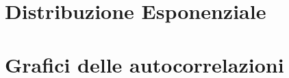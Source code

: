 \section{Distribuzione Esponenziale}
\begin{comment}
\begin{figure}[H]
\begin{center}
	
	\texttt{[image: grafici\_Exponential/AverageResponseTime.png]}
	\caption[Tempo di risposta del sistema senza Overload Management (Legge Front-End:Esponenziale)]
	{Tempo di risposta del sistema senza Overload Management (Legge Front-End:Esponenziale)}
	\label{fig:exp_res_time}
	\end{center}
	\end{figure}
	
\begin{figure}[H]
	
\begin{center}
	\texttt{[image: grafici\_Exponential/ThroughputSessions.png]}
	\caption[Throughput del sistema senza Overload Management (Legge Front-End:Esponenziale)]
	{Tempo di risposta del sistema senza Overload Management (Legge Front-End:Esponenziale)}
	\label{fig:exp_res_time}
	\end{center}
	\end{figure}
\end{comment}
\section{Grafici delle autocorrelazioni}
\begin{comment}
\begin{figure}[H]
	\begin{center}
	\texttt{[image: grafici\_Autocorrelazione/seed625435336.png]}
	\caption[Autocorrelazione per il seed 625435336]{Autocorrelazione per il seed 625435336.}
	\label{fig:exp_res_time}
	\end{center}
\end{figure}

\begin{figure}[H]
	\begin{center}
	\texttt{[image: grafici\_Autocorrelazione/seed37524306.png]}
	\caption[Autocorrelazione per il seed 37524306]{Autocorrelazione per il seed 37524306.}
	\label{fig:exp_res_time}
	\end{center}
\end{figure}

\begin{figure}[H]
	\begin{center}
	\texttt{[image: grafici\_Autocorrelazione/seed123456789.png]}
	\caption[Autocorrelazione per il seed 123456789]{Autocorrelazione per il seed 123456789.}
	\label{fig:exp_res_time}
	\end{center}
\end{figure}
\end{comment}